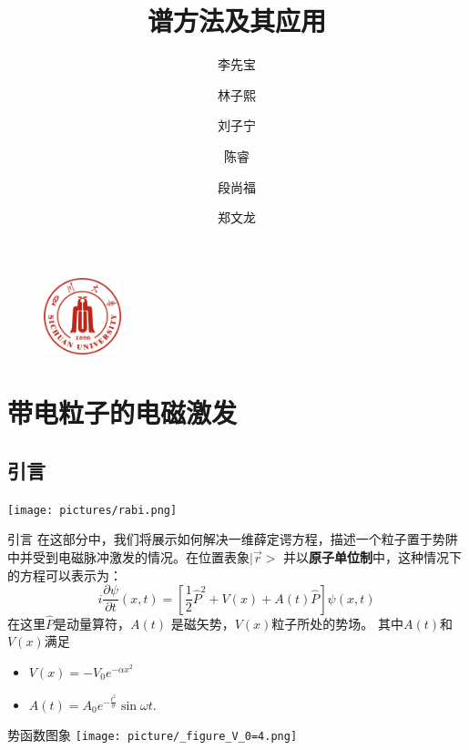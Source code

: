 \documentclass[aspectratio=169]{beamer}
\title[谱方法及其应用]{谱方法及其应用}
\author{李先宝 \and 林子熙 \and 刘子宁 \and 陈睿 \and 段尚福 \and 郑文龙}
\institute[Sichuan University]{Sichuan University}
\date{}
\begin{document}
\begin{frame}
    \titlepage
    \begin{figure}
        \centering
        \includegraphics[width=0.2\textwidth]{pic/sculogo.png}
    \end{figure}
\end{frame}


  \section{带电粒子的电磁激发}
\subsection{引言}

\begin{frame}
    \centering
\texttt{[image: pictures/rabi.png]}
\end{frame}
\begin{frame}{引言}
    在这部分中，我们将展示如何解决一维薛定谔方程，描述一个粒子置于势阱中并受到电磁脉冲激发的情况。在位置表象$|\vec{r}>$ 并以\textbf{原子单位制}中，这种情况下的方程可以表示为：
    \begin{equation}
    i\dfrac{\partial\psi}{\partial t}(x,t)=\left[\dfrac{1}{2}\hat{P}^2+V(x)+A(t)\hat{P}\right]\psi(x,t)
   \label{eq:薛定谔方程}
\end{equation}
在这里$\hat{P}$是动量算符，$A(t)$ 是磁矢势，$V(x)$粒子所处的势场。
\pause
其中$A(t)$和$V(x)$满足
\begin{itemize}
    \item $V(x)=-V_0e^{-\alpha x^2}$ 
    \item $A(t)=A_0e^{-\frac{t^2}\sigma}\sin\omega t.$
\end{itemize}
\end{frame}



\begin{frame}{势函数图象}
    \centering
    \texttt{[image: picture/\_figure\_V\_0=4.png]}

\end{frame}
\end{document}
